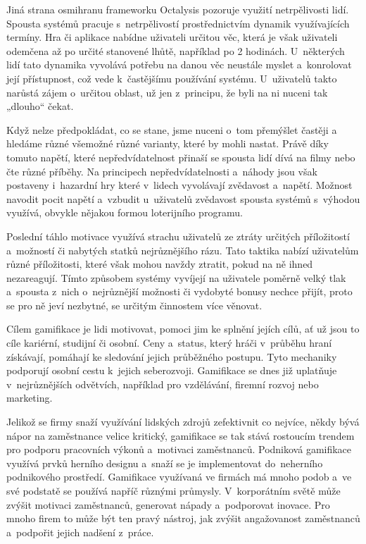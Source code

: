 \documentclass[12pt]{article}
\begin{document}
Jiná strana osmihranu frameworku Octalysis pozoruje využití
netrpělivosti lidí. Spousta systémů pracuje s~netrpělivostí
prostřednictvím dynamik využívajících termíny. 
Hra či aplikace nabídne uživateli určitou věc, která je však uživateli 
odemčena až po určité stanovené lhůtě, například po 2 hodinách.
U~některých lidí tato dynamika vyvolává potřebu na danou věc neustále myslet
a~konrolovat její přístupnost, což vede k~častějšímu používání systému.
U~uživatelů takto narůstá zájem o~určitou oblast, už jen z~principu,
že byli na ni nuceni tak „dlouho“ čekat.

Když nelze předpokládat, co se stane, jsme nuceni o~tom přemýšlet častěji a~
hledáme různé všemožné různé varianty, které by mohli nastat.
Právě díky tomuto napětí, které nepředvídatelnost přinaší se spousta lidí 
dívá na filmy nebo čte různé příběhy. 
Na principech nepředvídatelnosti a~náhody jsou však postaveny i~hazardní hry
které v~lidech vyvolávají zvědavost a~napětí.
Možnost navodit pocit napětí a~vzbudit u~uživatelů zvědavost spousta systémů
s~výhodou využívá, obvykle nějakou formou loterijního programu.

Poslední táhlo motivace využívá strachu uživatelů ze ztráty určitých příložitostí 
a~možností či nabytých statků nejrůznějšího rázu. 
Tato taktika nabízí uživatelům různé příložitosti, které však mohou navždy ztratit,
pokud na ně ihned nezareagují. 
Tímto způsobem systémy vyvíjejí na uživatele poměrně velký tlak
a~spousta z~nich o~nejrůznější možnosti či vydobyté bonusy nechce přijít,
proto se pro ně jeví nezbytné, se určitým činnostem více věnovat.


Cílem gamifikace je lidi motivovat, 
pomoci jim ke splnění jejích cílů, ať už jsou to cíle kariérní, studijní či osobní.
Ceny a~status, který hráči v~průběhu hraní získávají,
pomáhají ke sledování jejich průběžného postupu.
Tyto mechaniky podporují osobní cestu k~jejich seberozvoji. 
Gamifikace se dnes již uplatňuje v~nejrůznějších odvětvích,
například pro vzdělávání, firemní rozvoj nebo marketing.



Jelikož se firmy snaží využívání lidských zdrojů zefektivnit co nejvíce, 
někdy bývá nápor na zaměstnance velice kritický,
gamifikace se tak stává rostoucím trendem pro podporu pracovních výkonů
a~motivaci zaměstnanců.
Podniková gamifikace využívá prvků herního designu a~snaží se
je implementovat do~neherního podnikového prostředí. 
Gamifikace využívaná ve firmách
má mnoho podob a~ve své podstatě se používá napříč různými průmysly. 
V~korporátním světě může zvýšit motivaci zaměstnanců, generovat nápady a~podporovat inovace. 
Pro mnoho firem to může být ten pravý nástroj, jak zvýšit angažovanost zaměstnanců
a~podpořit jejich nadšení z~práce. 
\end{document}
